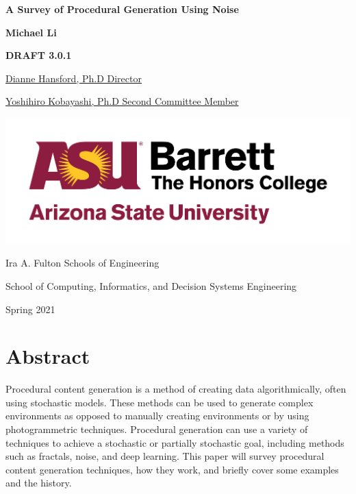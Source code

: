 \documentclass[10pt]{report}
\begin{document}
	\begin{titlepage}
		\begin{center}
			\Large
			\textbf{A Survey of Procedural Generation Using Noise}
			
			\vspace{1.5cm}
			\normalsize
			\textbf{Michael Li}
			
			\vfill
			
			\textbf{DRAFT 3.0.1}
			
			\uline{Dianne Hansford, Ph.D \hfill Director}
			\vspace{1cm}
			
			\uline{Yoshihiro Kobayashi, Ph.D \hfill Second Committee Member}
			
			\vspace{3cm}
			
			\includegraphics[scale=.5]{asu_barretthonors_horiz_rgb_maroongold_600ppi}
			
			\vspace{1.5cm}
			Ira A. Fulton Schools of Engineering
			
			School of Computing, Informatics, and Decision Systems Engineering
			
			Spring 2021
			
		\end{center}
	\end{titlepage}
	
	\chapter*{Abstract}
	
	Procedural content generation is a method of creating data algorithmically, often using stochastic models. These methods can be used to generate complex environments as opposed to manually creating environments or by using photogrammetric techniques. Procedural generation can use a variety of techniques to achieve a stochastic or partially stochastic goal, including methods such as fractals, noise, and deep learning. This paper will survey procedural content generation techniques, how they work, and briefly cover some examples and the history.
	
\end{document}
